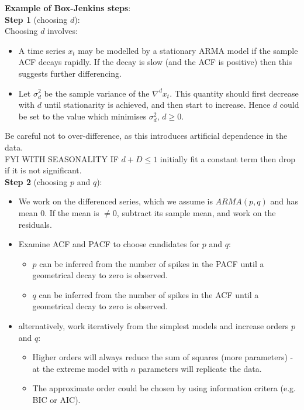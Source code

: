 \documentclass[11pt]{article}
\newcommand{\noi}{\noindent}
\begin{document}
\noi \textbf{Example of Box-Jenkins steps}: \\

\noi \textbf{Step 1} (choosing $d$): \\
\noi Choosing $d$ involves:
\begin{itemize}
    \item A time series $x_t$ may be modelled by a stationary ARMA model if the sample ACF decays rapidly. If the decay is slow (and the ACF is positive) then this suggests further differencing.
    \item Let $\sigma_d^2$ be the sample variance of the $\nabla^d x_t$. This quantity should first decrease with $d$ until stationarity is achieved, and then start to increase. Hence $d$ could be set to the value which minimises $\sigma_d^2$, $d \geq 0$.
\end{itemize}
\noi Be careful not to over-difference, as this introduces artificial dependence in the data. \\

\noi FYI WITH SEASONALITY IF $d + D \leq 1$ initially fit a constant term then drop if it is not significant. \\

\noi \textbf{Step 2} (choosing $p$ and $q$):
\begin{itemize}
    \item We work on the differenced series, which we assume is $ARMA(p, q)$ and has mean $0$. If the mean is $\neq 0$, subtract its sample mean, and work on the residuals.
    \item Examine ACF and PACF to choose candidates for $p$ and $q$:
        \begin{itemize}
            \item $p$ can be inferred from the number of spikes in the PACF until a geometrical decay to zero is observed.
            \item $q$ can be inferred from the number of spikes in the ACF until a geometrical decay to zero is observed.
        \end{itemize}
    \item alternatively, work iteratively from the simplest models and increase orders $p$ and $q$:
        \begin{itemize}
            \item Higher orders will always reduce the sum of squares (more parameters) - at the extreme model with $n$ parameters will replicate the data.
            \item The approximate order could be chosen by using information critera (e.g. BIC or AIC).
        \end{itemize}
\end{itemize}
\end{document}
